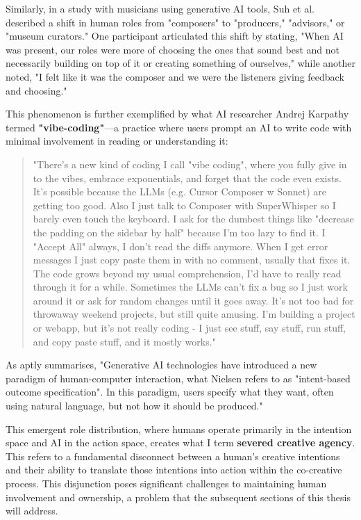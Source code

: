 Similarly, in a study with musicians using generative AI tools, Suh et al. \cite{Suh2021-cj} described a shift in human roles from "composers" to "producers," "advisors," or "museum curators." One participant articulated this shift by stating, "When AI was present, our roles were more of choosing the ones that sound best and not necessarily building on top of it or creating something of ourselves," while another noted, "I felt like it was the composer and we were the listeners giving feedback and choosing."

This phenomenon is further exemplified by what AI researcher Andrej Karpathy termed \textbf{"vibe-coding"}—a practice where users prompt an AI to write code with minimal involvement in reading or understanding it:

\begin{quote}
"There's a new kind of coding I call "vibe coding", where you fully give in to the vibes, embrace exponentials, and forget that the code even exists. It's possible because the LLMs (e.g. Cursor Composer w Sonnet) are getting too good. Also I just talk to Composer with SuperWhisper so I barely even touch the keyboard. I ask for the dumbest things like "decrease the padding on the sidebar by half" because I'm too lazy to find it. I "Accept All" always, I don't read the diffs anymore. When I get error messages I just copy paste them in with no comment, usually that fixes it. The code grows beyond my usual comprehension, I'd have to really read through it for a while. Sometimes the LLMs can't fix a bug so I just work around it or ask for random changes until it goes away. It's not too bad for throwaway weekend projects, but still quite amusing. I'm building a project or webapp, but it's not really coding - I just see stuff, say stuff, run stuff, and copy paste stuff, and it mostly works."
\end{quote}
As \cite{Weisz2024-io} aptly summarises, "Generative AI technologies have introduced a new paradigm of human-computer interaction, what Nielsen refers to as "intent-based outcome specification". In this paradigm, users specify what they want, often using natural language, but not how it should be produced."

This emergent role distribution, where humans operate primarily in the intention space and AI in the action space, creates what I term \textbf{severed creative agency}. This refers to a fundamental disconnect between a human's creative intentions and their ability to translate those intentions into action within the co-creative process. This disjunction poses significant challenges to maintaining human involvement and ownership, a problem that the subsequent sections of this thesis will address.

